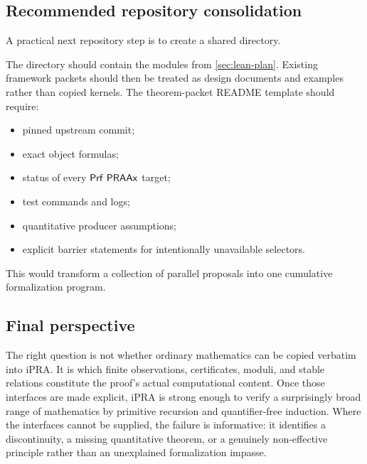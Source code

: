 \subsection{Recommended repository consolidation}

A practical next repository step is to create a shared directory.
\begin{center}
\end{center}
The directory should contain the modules from \cref{sec:lean-plan}.  Existing framework packets should then be treated as design documents and examples rather than copied kernels.  The theorem-packet README template should require:

\begin{itemize}
\item pinned upstream commit;
\item exact object formulas;
\item status of every \(\mathsf{Prf}\ \mathsf{PRAAx}\) target;
\item test commands and logs;
\item quantitative producer assumptions;
\item explicit barrier statements for intentionally unavailable selectors.
\end{itemize}

This would transform a collection of parallel proposals into one cumulative formalization program.

\subsection{Final perspective}

The right question is not whether ordinary mathematics can be copied verbatim into iPRA.  It is which finite observations, certificates, moduli, and stable relations constitute the proof's actual computational content.  Once those interfaces are made explicit, iPRA is strong enough to verify a surprisingly broad range of mathematics by primitive recursion and quantifier-free induction.  Where the interfaces cannot be supplied, the failure is informative: it identifies a discontinuity, a missing quantitative theorem, or a genuinely non-effective principle rather than an unexplained formalization impasse.
